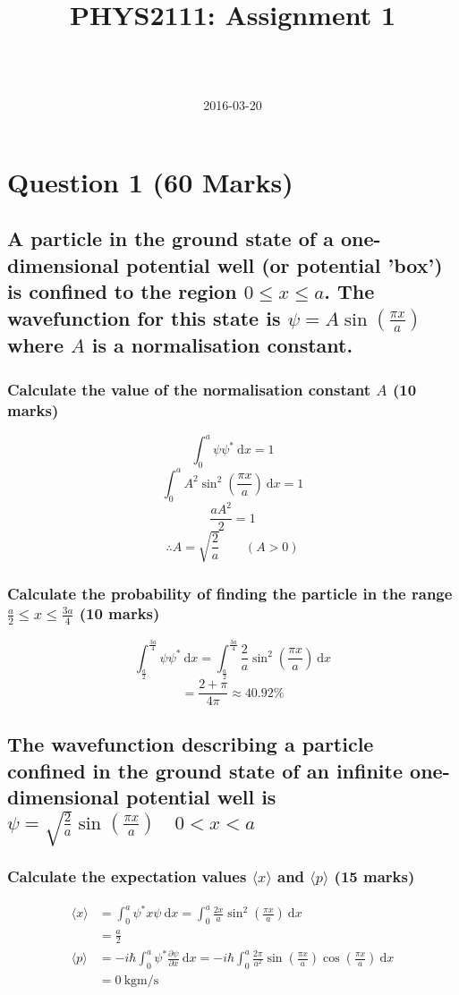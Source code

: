 \documentclass[a4paper]{scrartcl}
\begin{document}
\title{PHYS2111: Assignment 1}
\author{ \\ \\ }
\date{2016-03-20}
\maketitle

\section{Question 1 (60 Marks)}
\subsection{A particle in the ground state of a one-dimensional potential well (or potential 'box') is confined to the region \(0 \leq x \leq a\). The wavefunction for this state is \(\psi = A \sin(\frac{\pi x}{a})\) where \(A\) is a normalisation constant.}
\subsubsection{Calculate the value of the normalisation constant \(A\) (10 marks)}
\[\int_0^a \psi \psi^* \:\mathrm{d}x = 1\]
\[\int_0^a A^2 \sin^2(\frac{\pi x}{a}) \:\mathrm{d}x = 1\]
\[\frac{a A^2}{2} = 1\]
\[\therefore A = \sqrt{\frac{2}{a}} \qquad (A > 0)\]

\subsubsection{Calculate the probability of finding the particle in the range \(\frac{a}{2} \leq x \leq \frac{3 a}{4}\) (10 marks)}
\[\int_\frac{a}{2}^\frac{3 a}{4} \psi \psi^* \:\mathrm{d}x = \int_\frac{a}{2}^\frac{3 a}{4} \frac{2}{a} \sin^2(\frac{\pi x}{a}) \:\mathrm{d}x\]
\[= \frac{2 + \pi}{4 \pi} \approx 40.92\%\]

\subsection{The wavefunction describing a particle confined in the ground state of an infinite one-dimensional potential well is \(\psi = \sqrt{\frac{2}{a}} \sin(\frac{\pi x}{a}) \quad 0 < x < a\)}
\subsubsection{Calculate the expectation values \(\langle x \rangle\) and \(\langle p \rangle\) (15 marks)}
\begin{align*}
    \langle x \rangle &= \int_0^a \psi^* x \psi \:\mathrm{d}x = \int_0^a \frac{2 x}{a} \sin^2(\frac{\pi x}{a}) \:\mathrm{d}x \\
    &= \frac{a}{2} \\
    \langle p \rangle &= -i \hbar \int_0^a \psi^* \frac{\partial \psi}{\partial x} \:\mathrm{d}x = -i \hbar \int_0^a \frac{2 \pi}{a^2} \sin(\frac{\pi x}{a}) \cos(\frac{\pi x}{a}) \:\mathrm{d}x \\
    &= \SI{0}{\kilo\gram \metre \per \second}
\end{align*}
\end{document}
